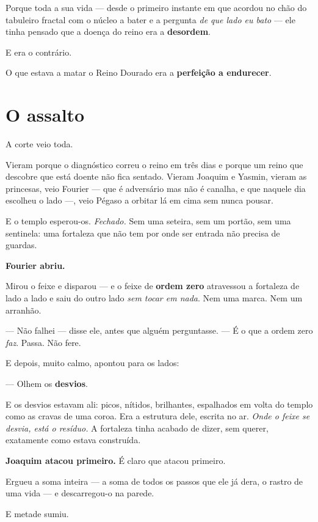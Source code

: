 \documentclass[livro.tex]{subfiles}
\begin{document}
Porque toda a sua vida --- desde o primeiro instante em que acordou no chão do tabuleiro fractal com o núcleo a bater e
a pergunta \emph{de que lado eu bato} --- ele tinha pensado que a doença do reino era a \textbf{desordem}.

E era o contrário.

O que estava a matar o Reino Dourado era a \textbf{perfeição a endurecer}.

\section*{O assalto}

A corte veio toda.

Vieram porque o diagnóstico correu o reino em três dias e porque um reino que descobre que está doente não fica
sentado. Vieram Joaquim e Yasmin, vieram as princesas, veio Fourier --- que é adversário mas não é canalha, e que
naquele dia escolheu o lado ---, veio Pégaso a orbitar lá em cima sem nunca pousar.

E o templo esperou-os. \emph{Fechado.} Sem uma seteira, sem um portão, sem uma sentinela: uma fortaleza que não tem
por onde ser entrada não precisa de guardas.

\medskip

\textbf{Fourier abriu.}

Mirou o feixe e disparou --- e o feixe de \textbf{ordem zero} atravessou a fortaleza de lado a lado e saiu do outro
lado \emph{sem tocar em nada}. Nem uma marca. Nem um arranhão.

--- Não falhei --- disse ele, antes que alguém perguntasse. --- É o que a ordem zero \emph{faz}. Passa. Não fere.

E depois, muito calmo, apontou para os lados:

--- Olhem os \textbf{desvios}.

E os desvios estavam ali: picos, nítidos, brilhantes, espalhados em volta do templo como as cravas de uma coroa. Era
a estrutura dele, escrita no ar. \emph{Onde o feixe se desvia, está o resíduo.} A fortaleza tinha acabado de dizer,
sem querer, exatamente como estava construída.

\medskip

\textbf{Joaquim atacou primeiro.} É claro que atacou primeiro.

Ergueu a soma inteira --- a soma de todos os passos que ele já dera, o rastro de uma vida --- e
descarregou-o na parede.

E metade sumiu.
\end{document}

